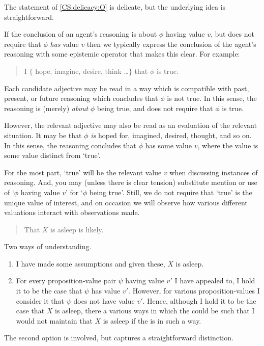 \begin{note}
  The statement of \ref{CS:delicacy:O} is delicate, but the underlying idea is straightforward.
  
  If the conclusion of an agent's reasoning is about \(\phi\) having value \(v\), but does not require that \(\phi\) \emph{has} value \(v\) then we typically express the conclusion of the agent's reasoning with some epistemic operator that makes this clear.
  For example:

  \begin{quote}
    I \(\{\) hope, imagine, desire, think \dots \(\}\) that \(\phi\) is true.
  \end{quote}
  Each candidate adjective may be read in a way which is compatible with past, present, or future reasoning which concludes that \(\phi\) is not true.
  In this sense, the reasoning is (merely) \emph{about} \(\phi\) being true, and does not require that \(\phi\) is true.

  However, the relevant adjective may also be read as an evaluation of the relevant situation.
  It may be that \(\phi\) \emph{is} hoped for, imagined, desired, thought, and so on.
  In this sense, the reasoning concludes that \(\phi\) has some value \(v\), where the value is some value distinct from `true'.

  For the most part, `true' will be the relevant value \(v\) when discussing instances of reasoning.
  And, you may (unless there is clear tension) substitute mention or use of `\(\phi\) having value \(v\)' for `\(\phi\) being true'.
  Still, we do not require that `true' is the unique value of interest, and on occasion we will observe how various different valuations interact with observations made.
\end{note}

\begin{note}
  \begin{quote}
    That \(X\) is asleep is likely.
  \end{quote}

  Two ways of understanding.
  \begin{enumerate}
  \item I have made some assumptions and given these, \(X\) is asleep.
  \item For every proposition-value pair \(\psi\) having value \(v'\) I have appealed to, I hold it to be the case that \(\psi\) has value \(v'\).
    However, for various proposition-values I consider it \epPAd{} that \(\psi\) does not have value \(v'\).
    Hence, although I hold it to be the case that \(X\) is asleep, there a various ways in which the \world{} could be such that I would not maintain that \(X\) is asleep if the \world{} is in such a way.
  \end{enumerate}
  The second option is involved, but captures a straightforward distinction.
\end{note}

